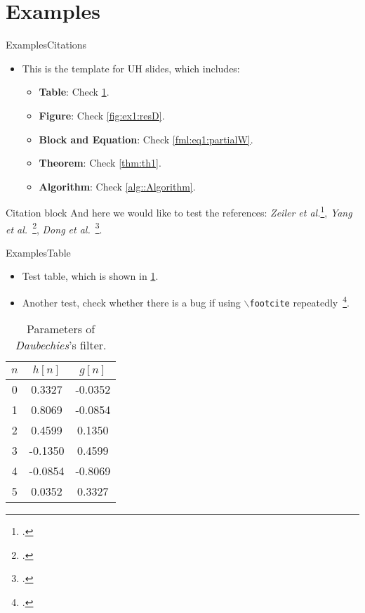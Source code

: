 \documentclass[10pt,xcolor={dvipsnames},aspectratio=169]{beamer}
\begin{document}
\section{Examples}
\begin{frame}{Examples}{Citations}
\begin{itemize}
  \item This is the template for UH slides, which includes:
  \begin{itemize}
    \item \textbf{Table}: Check \cref{tab:params}.
    \item \textbf{Figure}: Check \cref{fig:ex1:resD}.
    \item \textbf{Block and Equation}: Check \eqref{fml:eq1:partialW}.
    \item \textbf{Theorem}: Check \cref{thm:th1}.
    \item \textbf{Algorithm}: Check \cref{alg::Algorithm}.
  \end{itemize}
\end{itemize}
\begin{block}{Citation block}
  And here we would like to test the references: \textit{Zeiler et al.}\footcite{Zeiler5539957}, \textit{Yang et al.}~\footcite{Yang6175956}, \textit{Dong et al.}~\footcite{Dong7115171}.
\end{block}
\end{frame}


\begin{frame}{Examples}{Table}
\begin{itemize}
  \item Test table, which is shown in \cref{tab:params}.
  \item Another test, check whether there is a bug if using \texttt{$\backslash$footcite} repeatedly~\footcite{Dong7115171}.
\end{itemize}
\begin{table}[htbp]
  \centering
  \normalsize
  \caption[Parameters of Daubechies's filter.]{Parameters of \textit{Daubechies}'s filter.}
  \label{tab:params}
  \begin{tabular}{|c|c|c|}
    \hline
    $n$ & $h[n]$ & $g[n]$ \\ \hline
    0 &  0.3327 & -0.0352 \\ \hline
    1 &  0.8069 & -0.0854 \\ \hline
    2 &  0.4599 &  0.1350 \\ \hline
    3 & -0.1350 &  0.4599 \\ \hline
    4 & -0.0854 & -0.8069 \\ \hline
    5 &  0.0352 &  0.3327 \\ \hline
  \end{tabular}
\end{table}
\end{frame}
\end{document}
